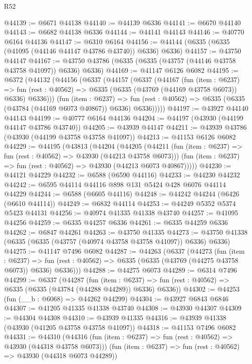 \begin{lexlean}{R52}
\begin{coremodule}
@44139 := @6671 @44138
@44140 := @44139 @6336
@44141 := @6670 @44140
@44143 := @6682 @44138 @6336
@44144 := @44141 @44143
@44146 := @40770 @6164 @44136
@44147 := @6310 @6164
@44156 := @44144 (@6335 (@6335 (@41095 (@44146 @44147 @43786 @43740)) @6336) @6336)
@44157 := @43750 @44147
@44167 := @43750 @43786 (@6335 (@6335 (@43757 (@44146 @43758 @43758 @41097)) @6336) @6336)
@44169 := @41147 @6126 @6082
@44195 := @6372
    (@44132
      (@44156
        (@6337
          (@44157
            (@6337
              (@44167
                (fun (item : @6237) =>
                fun (rest : @40562) => @6335 (@6335 (@43769 (@44169 @43758 @6073)) @6336) @6336)))
            (fun (item : @6237) =>
            fun (rest : @40562) => @6335 (@6335 (@43784 (@44169 @6073 @40867)) @6336) @6336)))))
@44197 := @43927 @44140 @44143
@44199 := @40777 @6164 @44136
@44204 := @44197 (@43930 (@44199 @44147 @43786 @43740))
@44205 := @43939 @44147
@44211 := @43939 @43786 (@43930 (@44199 @43758 @43758 @41097))
@44213 := @41153 @6126 @6082
@44229 := @44195
    (@43813
      (@44204
        (@44205
          (@44211 (fun (item : @6237) => fun (rest : @40562) => @43930 (@44213 @43758 @6073)))
          (fun (item : @6237) => fun (rest : @40562) => @43930 (@44213 @6073 @40867)))))
@44230 := @44121 @44229
@44232 := @6588 (@6590 @44116)
@44233 := @44230 @44232
@44242 := @6595 @44114 @44116 @898 @131 @5424 @428 @6076 @44114 @44229
@44244 := @6588 (@6605 @44116)
@44248 := @44242 @44244 (@6426 (@6610 @44114))
@44249 := @6832 @44114
@44253 := @44249 @5352 @5374 @5423 @44131
@44256 := @40974 @41335 @41338 @43740
@44257 := @41095 @44256
@44259 := @6335 @44257 @6336
@44261 := @6335 @44259 @6336
@44262 := @6847 @44261
@44263 := @43750 @41335
@44273 := @43750 @41338 (@6335 (@6335 (@43757 (@40974 @43758 @43758 @41097)) @6336) @6336)
@44275 := @41147 @7496 @6082
@44287 := @44263
    (@6337
      (@44273
        (fun (item : @6237) =>
        fun (rest : @40562) => @6335 (@6335 (@43769 (@44275 @43758 @6073)) @6336) @6336)))
@44288 := @44275 @6073
@44289 := @6314 @7496
@44299 := @6337
    (@44287
      (fun (item : @6237) =>
      fun (rest : @40562) => @6335 (@6335 (@43784 (@44288 @44289)) @6336) @6336))
@44302 := @44253 (fun (__b : @6068) => @44262 @44299)
@44304 := @43927 @6843 @6846
@44307 := @41205 @41335 @41338 @43740
@44308 := @43930 @44307
@44309 := @44304 @44308
@44310 := @43939 @41335
@44316 := @43939 @41338 (@43930 (@41205 @43758 @43758 @41097))
@44318 := @41153 @7496 @6082
@44331 := @44310
    (@44316 (fun (item : @6237) => fun (rest : @40562) => @43930 (@44318 @43758 @6073)))
    (fun (item : @6237) => fun (rest : @40562) => @43930 (@44318 @6073 @44289))

\end{coremodule}
\end{lexlean}
